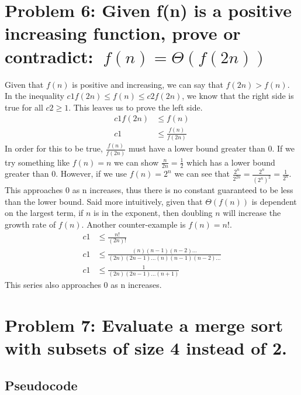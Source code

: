 \documentclass{article}
\begin{document}
\section{Problem 6: Given f(n) is a positive increasing function, prove or contradict: \(\medspace f(n) = \Theta(f(2n))\)}
    Given that \(f(n)\) is positive and increasing, we can say that \(f(2n) > f(n)\).
    In the inequality \(c1 f(2n) \le f(n) \le c2 f(2n)\), we know that the right side is true for all \(c2 \ge 1\).
    This leaves us to prove the left side.
    \begin{align}
        c1 f(2n) & \le f(n) \\
        c1 & \le \frac{f(n)}{f(2n)}
    \end{align}
    In order for this to be true, \(\frac{f(n)}{f(2n)}\) must have a lower bound greater than 0.
    If we try something like \(f(n) = n\) we can show \(\frac{n}{2n} = \frac{1}{2}\) which has a lower bound greater than 0.
    However, if we use \(f(n) = 2^n\) we can see that \(\frac{2^n}{2^{2n}} = \frac{2^n}{({2^n})^2} = \frac{1}{2^n}\).
    This approaches 0 as n increases, thus there is no constant guaranteed to be less than the lower bound.
    Said more intuitively, given that \(\Theta(f(n))\) is dependent on the largest term, if \(n\) is in the exponent, then doubling \(n\) will increase the growth rate of \(f(n)\).
    Another counter-example is \(f(n) = n!\).
    \begin{align}
        c1 & \le \frac{n!}{(2n)!} \\
        c1 & \le \frac{(n)(n-1)(n-2)\ldots}{(2n)(2n-1)\ldots(n)(n-1)(n-2)\ldots} \\
        c1 & \le \frac{1}{(2n)(2n-1)\ldots(n+1)}
    \end{align}
    This series also approaches 0 as n increases.

\section{Problem 7: Evaluate a merge sort with subsets of size 4 instead of 2.}
    \subsection{Pseudocode}
        
\end{document}
